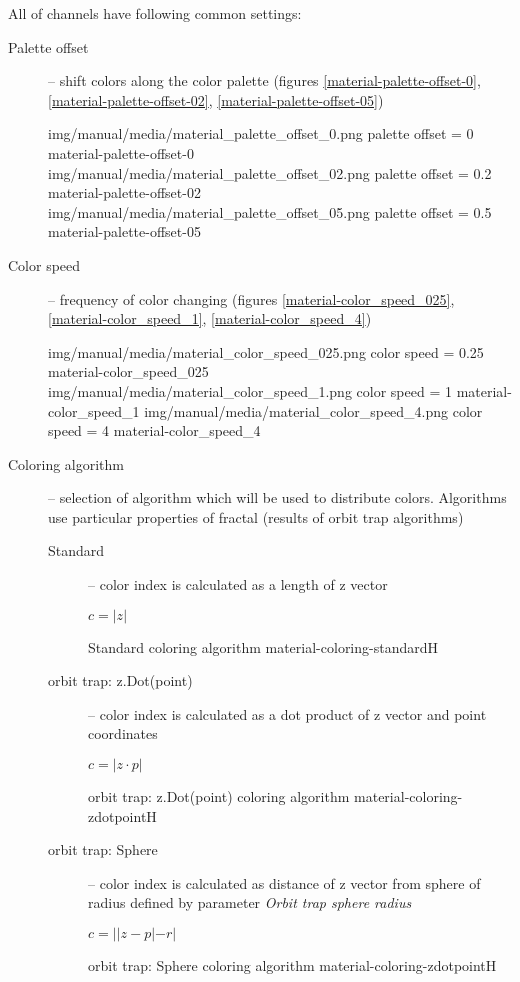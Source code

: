 All of channels have following common settings:
\begin{description}
	\item[Palette offset] -- shift colors along the color palette (figures \ref{material-palette-offset-0}, \ref{material-palette-offset-02}, \ref{material-palette-offset-05})
	
	\threeImagesWithTwoCaptionsFullWidth
	{img/manual/media/material_palette_offset_0.png}
	{palette offset = 0}
	{material-palette-offset-0}
	{img/manual/media/material_palette_offset_02.png}
	{palette offset = 0.2}
	{material-palette-offset-02}
	{img/manual/media/material_palette_offset_05.png}
	{palette offset = 0.5}
	{material-palette-offset-05}
	
	\item[Color speed] -- frequency of color changing (figures \ref{material-color_speed_025}, \ref{material-color_speed_1}, \ref{material-color_speed_4})
	
	\threeImagesWithTwoCaptionsFullWidth
	{img/manual/media/material_color_speed_025.png}
	{color speed = 0.25}
	{material-color_speed_025}
	{img/manual/media/material_color_speed_1.png}
	{color speed = 1}
	{material-color_speed_1}
	{img/manual/media/material_color_speed_4.png}
	{color speed = 4}
	{material-color_speed_4}
	
	\item[Coloring algorithm] -- selection of algorithm which will be used to distribute colors. Algorithms use particular properties of fractal (results of orbit trap algorithms)
	\begin{description}
		\item[Standard] -- color index is calculated as a length of z vector
		\begin{center}
			\(c = |z|\)
		\end{center}
		{Standard coloring algorithm}
		{material-coloring-standard}{H}
		
		\item[orbit trap: z.Dot(point)] -- color index is calculated as a dot product of z vector and point coordinates
		\begin{center}
			\(c = |z \cdot p|\)
		\end{center}
		{orbit trap: z.Dot(point) coloring algorithm}
		{material-coloring-zdotpoint}{H}
		
		\item[orbit trap: Sphere] -- color index is calculated as distance of z vector from sphere of radius defined by parameter \emph{Orbit trap sphere radius}
		\begin{center}
			\(c = ||z - p|-r|\)
		\end{center}
		{orbit trap: Sphere coloring algorithm}
		{material-coloring-zdotpoint}{H}
		

\end{description}
\end{description}
